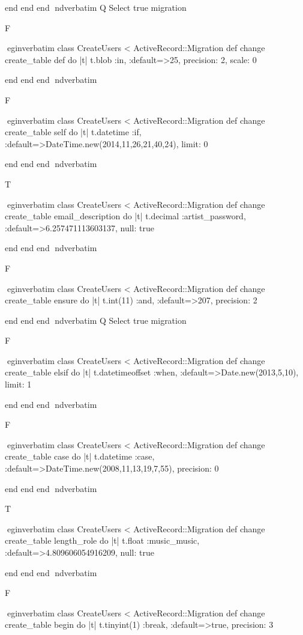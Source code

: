     end 
  end 
end
nd{verbatim}
Q
 Select true migration

F

egin{verbatim}
 class CreateUsers < ActiveRecord::Migration 
  def change 
    create_table def do |t| 
      t.blob :in, :default=>25, precision: 2, scale: 0
    
    end 
  end 
end
nd{verbatim}

F

egin{verbatim}
 class CreateUsers < ActiveRecord::Migration 
  def change 
    create_table self do |t| 
      t.datetime :if, :default=>DateTime.new(2014,11,26,21,40,24), limit: 0
    
    end 
  end 
end
nd{verbatim}

T

egin{verbatim}
 class CreateUsers < ActiveRecord::Migration 
  def change 
    create_table email_description do |t| 
      t.decimal :artist_password, :default=>6.257471113603137, null: true
    
    end 
  end 
end
nd{verbatim}

F

egin{verbatim}
 class CreateUsers < ActiveRecord::Migration 
  def change 
    create_table ensure do |t| 
      t.int(11) :and, :default=>207, precision: 2
    
    end 
  end 
end
nd{verbatim}
Q
 Select true migration

F

egin{verbatim}
 class CreateUsers < ActiveRecord::Migration 
  def change 
    create_table elsif do |t| 
      t.datetimeoffset :when, :default=>Date.new(2013,5,10), limit: 1
    
    end 
  end 
end
nd{verbatim}

F

egin{verbatim}
 class CreateUsers < ActiveRecord::Migration 
  def change 
    create_table case do |t| 
      t.datetime :case, :default=>DateTime.new(2008,11,13,19,7,55), precision: 0
    
    end 
  end 
end
nd{verbatim}

T

egin{verbatim}
 class CreateUsers < ActiveRecord::Migration 
  def change 
    create_table length_role do |t| 
      t.float :music_music, :default=>4.809606054916209, null: true
    
    end 
  end 
end
nd{verbatim}

F

egin{verbatim}
 class CreateUsers < ActiveRecord::Migration 
  def change 
    create_table begin do |t| 
      t.tinyint(1) :break, :default=>true, precision: 3
    
